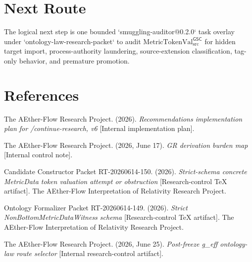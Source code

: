 \documentclass[11pt]{article}
\newcommand{\MetricTokenVal}{\mathrm{MetricTokenVal}_{\mathrm{src}}^{\mathsf{GSC}}}
\begin{document}
\section{Next Route}

The logical next step is one bounded `smuggling-auditor@0.2.0` task overlay
under `ontology-law-research-packet` to audit \(\MetricTokenVal\) for hidden
target import, process-authority laundering, source-extension classification,
tag-only behavior, and premature promotion.

\section{References}

The AEther-Flow Research Project. (2026). \emph{Recommendations
implementation plan for /continue-research, v6} [Internal implementation
plan].

The AEther-Flow Research Project. (2026, June 17). \emph{GR derivation burden
map} [Internal control note].

Candidate Constructor Packet RT-20260614-150. (2026). \emph{Strict-schema
concrete MetricData token valuation attempt or obstruction}
[Research-control TeX artifact]. The AEther-Flow Interpretation of Relativity
Research Project.

Ontology Formalizer Packet RT-20260614-149. (2026). \emph{Strict
NonBottomMetricDataWitness schema} [Research-control TeX artifact]. The
AEther-Flow Interpretation of Relativity Research Project.

The AEther-Flow Research Project. (2026, June 25). \emph{Post-freeze g_eff
ontology-law route selector} [Internal research-control artifact].
\end{document}
